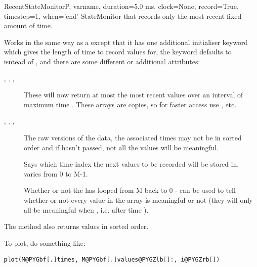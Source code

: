 \documentclass[letterpaper,10pt,english]{manual}
\begin{document}
\hypertarget{brian.RecentStateMonitor}{}\begin{classdesc}{RecentStateMonitor}{P, varname, duration=5.0 ms, clock=None, record=True, timestep=1, when='end'}
StateMonitor that records only the most recent fixed amount of time.

Works in the same way as a \hyperlink{brian.StateMonitor}{} except that it has one
additional initialiser keyword  which gives the length of
time to record values for, the  keyword defaults to 
isntead of , and there are some different or additional
attributes:
\begin{description}
\item[, , , ]
These will now return at most the most recent values over an
interval of maximum time . These arrays are copies,
so for faster access use , etc.

\item[, , , ]
The raw versions of the data, the associated times may not be
in sorted order and if  hasn't passed, not all the
values will be meaningful.

\item[]
Says which time index the next values to be recorded will be stored
in, varies from 0 to M-1.

\item[]
Whether or not the  has looped from M back to
0 - can be used to tell whether or not every value in the
 array is meaningful or not (they will only all
be meaningful when , i.e. after time ).

\end{description}

The  method also returns values in sorted order.

To plot, do something like:

\begin{Verbatim}[commandchars=@\[\]]
plot(M@PYGbf[.]times, M@PYGbf[.]values@PYGZlb[]:, i@PYGZrb[])
\end{Verbatim}
\end{classdesc}
\end{document}
